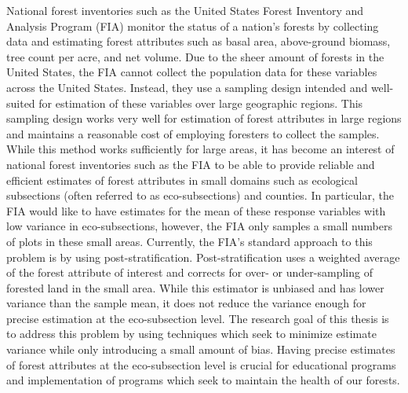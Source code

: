\documentclass[12pt,twoside]{reedthesis}
\begin{document}
National forest inventories such as the United States Forest Inventory and Analysis Program (FIA) monitor the status of a nation's forests by collecting data and estimating forest attributes such as basal area, above-ground biomass, tree count per acre, and net volume. Due to the sheer amount of forests in the United States, the FIA cannot collect the population data for these variables across the United States. Instead, they use a sampling design intended and well-suited for estimation of these variables over large geographic regions. This sampling design works very well for estimation of forest attributes in large regions and maintains a reasonable cost of employing foresters to collect the samples. While this method works sufficiently for large areas, it has become an interest of national forest inventories such as the FIA to be able to provide reliable and efficient estimates of forest attributes in small domains such as ecological subsections (often referred to as eco-subsections) and counties. In particular, the FIA would like to have estimates for the mean of these response variables with low variance in eco-subsections, however, the FIA only samples a small numbers of plots in these small areas. Currently, the FIA's standard approach to this problem is by using post-stratification. Post-stratification uses a weighted average of the forest attribute of interest and corrects for over- or under-sampling of forested land in the small area. While this estimator is unbiased and has lower variance than the sample mean, it does not reduce the variance enough for precise estimation at the eco-subsection level. The research goal of this thesis is to address this problem by using techniques which seek to minimize estimate variance while only introducing a small amount of bias. Having precise estimates of forest attributes at the eco-subsection level is crucial for educational programs and implementation of programs which seek to maintain the health of our forests.
\end{document}
